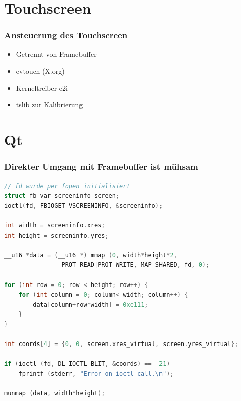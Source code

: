 \documentclass{beamer}
\begin{document}
  \section{Touchscreen}
	
	\begin{frame}
		\frametitle{Ansteuerung des Touchscreen}
		\begin{itemize}
			\item Getrennt von Framebuffer
			\item evtouch (X.org)
			\item Kerneltreiber e2i
			\item tslib zur Kalibrierung
		\end{itemize}
	\end{frame}	
	
	\section{Qt}
	
	\begin{frame}
  \frametitle{Direkter Umgang mit Framebuffer ist mühsam}
		\begin{lstlisting}[language=C, basicstyle=\scriptsize]
// fd wurde per fopen initialisiert
struct fb_var_screeninfo screen;
ioctl(fd, FBIOGET_VSCREENINFO, &screeninfo);

int width = screeninfo.xres;
int height = screeninfo.yres;

__u16 *data = (__u16 *) mmap (0, width*height*2, 
                PROT_READ|PROT_WRITE, MAP_SHARED, fd, 0);

for (int row = 0; row < height; row++) {
    for (int column = 0; column< width; column++) {
        data[column+row*width] = 0xe111;
    }
}

int coords[4] = {0, 0, screen.xres_virtual, screen.yres_virtual};

if (ioctl (fd, DL_IOCTL_BLIT, &coords) == -21) 
    fprintf (stderr, "Error on ioctl call.\n");

munmap (data, width*height);
		\end{lstlisting}
	\end{frame}	
	
\end{document}
